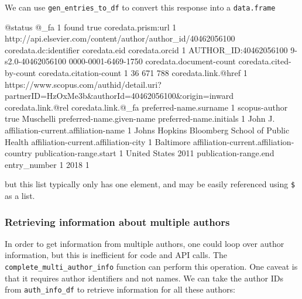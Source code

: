 We can use \texttt{gen\_entries\_to\_df} to convert this response into a
\texttt{data.frame}

\begin{Schunk}
\begin{Soutput}
  @status @_fa
1   found true
                                            coredata.prism:url
1 http://api.elsevier.com/content/author/author_id/40462056100
  coredata.dc:identifier       coredata.eid      coredata.orcid
1  AUTHOR_ID:40462056100 9-s2.0-40462056100 0000-0001-6469-1750
  coredata.document-count coredata.cited-by-count coredata.citation-count
1                      36                     671                     788
                                                                             coredata.link.@href
1 https://www.scopus.com/authid/detail.uri?partnerID=HzOxMe3b&authorId=40462056100&origin=inward
  coredata.link.@rel coredata.link.@_fa preferred-name.surname
1      scopus-author               true              Muschelli
  preferred-name.given-name preferred-name.initials
1                      John                      J.
             affiliation-current.affiliation-name
1 Johns Hopkins Bloomberg School of Public Health
  affiliation-current.affiliation-city
1                            Baltimore
  affiliation-current.affiliation-country publication-range.start
1                           United States                    2011
  publication-range.end entry_number
1                  2018            1
\end{Soutput}
\end{Schunk}

but this list typically only has one element, and may be easily
referenced using \texttt{\$} as a list.

\hypertarget{retrieving-information-about-multiple-authors}{%
\subsubsection{Retrieving information about multiple
authors}\label{retrieving-information-about-multiple-authors}}

In order to get information from multiple authors, one could loop over
author information, but this is inefficient for code and API calls. The
\texttt{complete\_multi\_author\_info} function can perform this
operation. One caveat is that it requires author identifiers and not
names. We can take the author IDs from \texttt{auth\_info\_df} to
retrieve information for all these authors:

